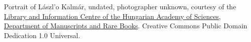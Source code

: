 Portrait of L\'aszl'o Kalm\'ar, undated, photographer unknown,
courtesy of the \href{http://konyvtar.mta.hu/index_en.php}{Library and
Information Centre of the Hungarian Academy of Sciences, Department of
Manuscripts and Rare Books}. Creative Commons Public Domain Dedication
1.0 Universal.
